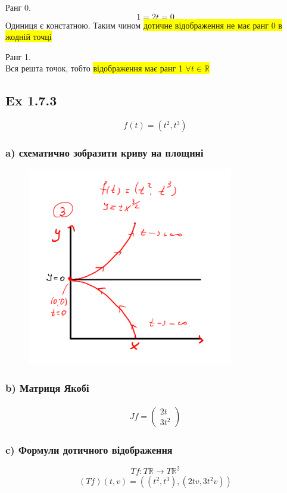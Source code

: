 \documentclass[10pt, a4paper]{article} %
\newcommand{\R}{\mathbb{R}}
\begin{document}
Ранг 0.
\[1 = 2t = 0\]
Одиниця є констатною.
Таким чином \colorbox{yellow}{дотичне відображення не має ранг 0 в жодній точці}

Ранг 1.\\
Вся решта точок, тобто \colorbox{yellow}{відображення має ранг 1 $\forall t \in \R$}


\subsection*{Ex 1.7.3}
\[f(t) = (t^2, t^3)\]

\subsubsection*{a) схематично зобразити криву на площині}
\begin{figure}[h]
    \includegraphics[width=0.8\textwidth]{1.7.3.png}
    \centering
\end{figure}


\subsubsection*{b) Матриця Якобі}
\begin{align*}
    Jf = \begin{pmatrix}
        2t \\ 3t^2
    \end{pmatrix}
\end{align*}

\subsubsection*{c) Формули дотичного відображення}
\[Tf : T\R \to T\R^2\]
\begin{align*}
    (Tf)(t, v) = \left((t^2, t^3), (2tv, 3t^2v)\right)
\end{align*}
\end{document}
